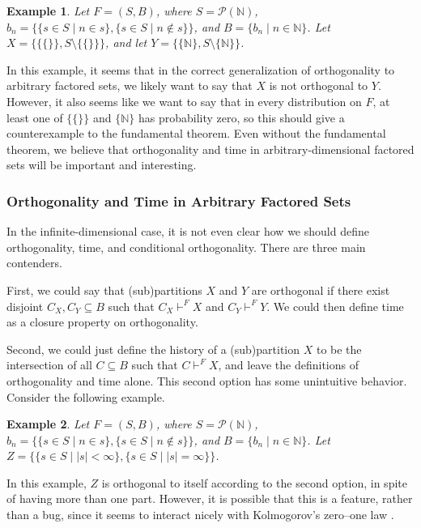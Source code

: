 \documentclass[authordate,onecolumn]{miri-tech-article}
\newtheorem{example}{Example}
\begin{document}
\begin{example}
Let $F=(S,B)$, where $S=\mathcal{P}(\mathbb{N})$, $b_n=\{\{s\in S\mid n\in s\},\{s\in S\mid n\notin s\}\}$, and $B=\{b_n\mid n\in \mathbb{N}\}$. Let $X=\{\{\{\}\},S\setminus \{\{\}\}\}$, and let $Y=\{\{\mathbb{N}\},S\setminus \{\mathbb{N}\}\}$. 
\end{example}

In this example, it seems that in the correct generalization of orthogonality to arbitrary factored sets, we likely want to say that $X$ is not orthogonal to $Y$. However, it also seems like we want to say that in every distribution on $F$, at least one of $\{\{\}\}$ and $\{\mathbb{N}\}$ has probability zero, so this should give a counterexample to the fundamental theorem. 
Even without the fundamental theorem, we believe that orthogonality and time in arbitrary-dimensional factored sets will be important and interesting.

\subsubsection{Orthogonality and Time in Arbitrary Factored Sets}

In the infinite-dimensional case, it is not even clear how we should define orthogonality, time, and conditional orthogonality. There are three main contenders. 

First, we could say that (sub)partitions $X$ and $Y$ are orthogonal if there exist disjoint $C_X,C_Y\subseteq B$ such that $C_X\vdash^F X$ and $C_Y\vdash^F Y$. We could then define time as a closure property on orthogonality.

Second, we could just define the history of a (sub)partition $X$ to be the intersection of all $C\subseteq B$ such that $C\vdash^F X$, and leave the definitions of orthogonality and time alone. This second option has some unintuitive behavior. Consider the following example.

\begin{example}
Let $F=(S,B)$, where $S=\mathcal{P}(\mathbb{N})$, $b_n=\{\{s\in S\mid n\in s\},\{s\in S\mid n\notin s\}\}$, and $B=\{b_n\mid n\in \mathbb{N}\}$. Let $Z=\{\{s\in S\mid |s|<\infty\},\{s\in S\mid |s|=\infty\}\}$. 
\end{example}

In this example, $Z$ is orthogonal to itself according to the second option, in spite of having more than one part. However, it is possible that this is a feature, rather than a bug, since it seems to interact nicely with Kolmogorov's zero–one law \citep{Kolmogorov:1956}.
\end{document}
